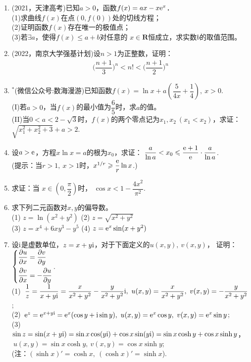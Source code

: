 \begin{enumerate}[label={\textbf{\arabic*.}},leftmargin=
    \inteval{\myenumleftmargin}pt]
\item (2021，天津高考)已知$ a>0 $，函数$ f(x)=ax-x\mathrm{e}^x $．\\
(1)求曲线$ f(x) $在点$ (0,f(0)) $处的切线方程；\\
(2)证明函数$ f(x) $存在唯一的极值点；\\
(3)若$ \exists a $，使得$ f(x)\leq a+b $对任意的
$ x\in \textbf{R} $恒成立，求实数$ b $的取值范围。

\item (2022，南京大学强基计划)设$n>1$为正整数，证明：
\begin{align*}
    \Big(\dfrac{n+1}{3}\Big)^{n}<n!<\Big(\dfrac{n+1}{2}\Big)^{n}
\end{align*}

\item $ ^* $(微信公众号:数海漫游)已知函数$ f(x)=\ln x+a\left(\dfrac{5}{4x}+\dfrac{1}{4}\right),\ x>0 $.\\
(I)若$ a>0 $，当$ f(x) $的最小值为$ \dfrac{6}{5} $时，求$ a $的值。\\
(II)当$ 0<a<2-\sqrt{3} $时，$ f(x) $的两个零点记为$ x_1,x_2\ (x_1<x_2) $，求证：$ \sqrt{x_1^2+x_2^2+3}+a>2 $.

\item 设$ a>\mathrm{e} $，方程$ x\ln x=a $的根为$ x_0 $，求证：
$ \dfrac{a}{\ln a}<x_0\leqslant \dfrac{\mathrm{e}+1}{\mathrm{e}}\cdot \dfrac{a}{\ln a} $. \\
(提示：当$ r>1,\ x>1 $时，$ x^{1/r}\geqslant \dfrac{\mathrm{e}}{r}\ln x $.)

\item 求证：当 $ x\in \left(0,\dfrac{\pi}{2}\right) $时，
$ \cos x<1-\dfrac{4x^2}{\pi^2} $.

\item 求下列二元函数对$ x,y $的偏导数。\\
(1) $ z=\ln(x^2+y^2) $ \quad (2) $ z=\sqrt{x^2+y^2} $ \\
(3) $ z=x^4+6xy^3-y^5 $ \quad (4) $ z=\mathrm{e}^x\sin(x+y^2)  $ 

\item 设$ \mathrm{i} $是虚数单位，$ z=x+ y\mathrm{i} $，对于下面定义的$ u(x,y),\ v(x,y) $，
证明：$ \begin{dcases}
    \dfrac{\partial u}{\partial x} =\dfrac{\partial v}{\partial y} \\
    \dfrac{\partial v}{\partial x} =-\dfrac{\partial u}{\partial y} 
\end{dcases} $. \\
(1)\ $ \dfrac{1}{z}=\dfrac{1}{x+y\mathrm{i}}=\dfrac{x}{x^2+y^2}-\dfrac{y}{x^2+y^2}\mathrm{i},
\ u(x,y)=\dfrac{x}{x^2+y^2},\ v(x,y)=-\dfrac{y}{x^2+y^2} $; \\
(2)\ $ \e^{z}=\e^{x+y\i}=\e^x(\cos y+\i\sin y),\ u(x,y)=\e^x \cos y,
\ v(x,y)=\e^x\sin y $; \\
(3)\ $ \sin z=\sin(x+y\mathrm{i})=\sin x\cos(y\mathrm{i})+\cos x\sin(y\mathrm{i})=\sin x\cosh y+
\cos x\sinh y $， \\ $\ u(x,y)=\sin x\cosh y,\ v(x,y)=\cos x\sinh y $; \\
(注：$ (\sinh x)'=\cosh x,\ (\cosh x)'=\sinh x $). 


\end{enumerate}
